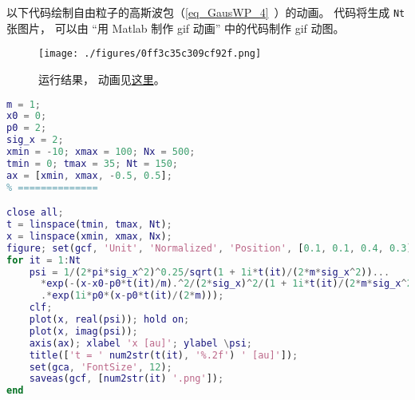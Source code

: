 
\begin{issues}
\issueDraft
\end{issues}


以下代码绘制自由粒子的高斯波包（\autoref{eq_GausWP_4}~）的动画。 代码将生成 \verb|Nt| 张图片， 可以由 “用 Matlab 制作 gif 动画” 中的代码制作 gif 动图。

\begin{figure}[ht]
\centering
\texttt{[image: ./figures/0ff3c35c309cf92f.png]}
\caption{运行结果， 动画见\href{https://wuli.wiki/apps/free_gauss.html}{这里}。} \label{fig_FreeGs_1}
\end{figure}

\begin{lstlisting}[language=matlab, caption=free\_gauss.m]
% === 参数 (原子单位) ===
m = 1;
x0 = 0;
p0 = 2;
sig_x = 2;
xmin = -10; xmax = 100; Nx = 500;
tmin = 0; tmax = 35; Nt = 150;
ax = [xmin, xmax, -0.5, 0.5];
% ==============

close all;
t = linspace(tmin, tmax, Nt);
x = linspace(xmin, xmax, Nx);
figure; set(gcf, 'Unit', 'Normalized', 'Position', [0.1, 0.1, 0.4, 0.3]);
for it = 1:Nt
    psi = 1/(2*pi*sig_x^2)^0.25/sqrt(1 + 1i*t(it)/(2*m*sig_x^2))...
      *exp(-(x-x0-p0*t(it)/m).^2/(2*sig_x)^2/(1 + 1i*t(it)/(2*m*sig_x^2)))...
      .*exp(1i*p0*(x-p0*t(it)/(2*m)));
    clf;
    plot(x, real(psi)); hold on;
    plot(x, imag(psi));
    axis(ax); xlabel 'x [au]'; ylabel \psi;
    title(['t = ' num2str(t(it), '%.2f') ' [au]']);
    set(gca, 'FontSize', 12);
    saveas(gcf, [num2str(it) '.png']);
end
\end{lstlisting}
